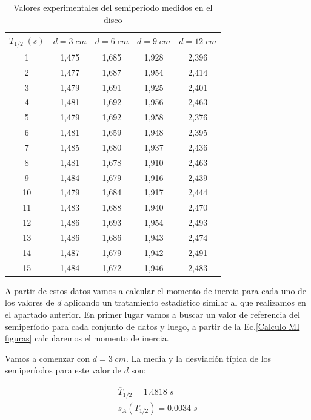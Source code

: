 \documentclass[a4paper,12pt,titlepage]{report}
\begin{document}
\begin{table}[h!]
    \centering
    \begin{tabular}{|c|c|c|c|c|}
    \hline
    $T_{1/2} \; (s)$ &$d=3 \; cm$ & $d=6 \;cm$ & $d=9 \; cm$ & $d=12 \; cm$ \\ \hline
    1  & 1,475 & 1,685 & 1,928 & 2,396 \\ \hline
    2  & 1,477 & 1,687 & 1,954 & 2,414 \\ \hline
    3  & 1,479 & 1,691 & 1,925 & 2,401 \\ \hline
    4  & 1,481 & 1,692 & 1,956 & 2,463 \\ \hline
    5  & 1,479 & 1,692 & 1,958 & 2,376 \\ \hline
    6  & 1,481 & 1,659 & 1,948 & 2,395 \\ \hline
    7  & 1,485 & 1,680 & 1,937 & 2,436 \\ \hline
    8  & 1,481 & 1,678 & 1,910 & 2,463 \\ \hline
    9  & 1,484 & 1,679 & 1,916 & 2,439 \\ \hline
    10 & 1,479 & 1,684 & 1,917 & 2,444 \\ \hline
    11 & 1,483 & 1,688 & 1,940 & 2,470 \\ \hline
    12 & 1,486 & 1,693 & 1,954 & 2,493 \\ \hline
    13 & 1,486 & 1,686 & 1,943 & 2,474 \\ \hline
    14 & 1,487 & 1,679 & 1,942 & 2,491 \\ \hline
    15 & 1,484 & 1,672 & 1,946 & 2,483 \\ \hline
    \end{tabular}
    \caption{Valores experimentales del semiperíodo medidos en el disco}
    \label{semiT Steiner1}
    \end{table}

\newpage


A partir de estos datos vamos a calcular el momento de inercia para cada uno de los valores de $d$ aplicando un tratamiento estadístico similar al que realizamos en el apartado anterior. En primer lugar vamos a buscar un valor de referencia del semiperíodo para cada conjunto de datos y luego, a partir de la Ec.\ref{Calculo MI figuras} calcularemos el momento de inercia.

\par Vamos a comenzar con $d=3\; cm$. La media y la desviación típica de los semiperíodos para este valor de $d$ son:

\begin{equation}
    \begin{gathered}
        \overline{T}_{1/2} = 1.4818\; s \\
        s_A(T_{1/2}) =  0.0034 \; s
    \end{gathered}
\end{equation}
\end{document}
